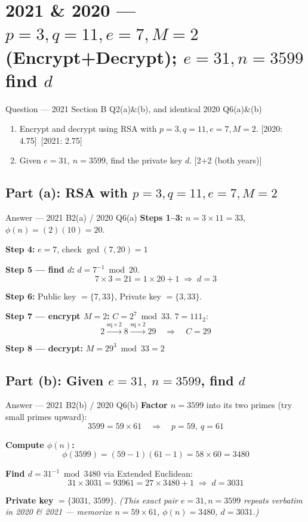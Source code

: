 \documentclass[12pt,a4paper]{article}
\begin{document}
\section{2021 \& 2020 --- $p=3,q=11,e=7,M=2$ (Encrypt+Decrypt); $e=31,n=3599$ find $d$}

\begin{qbox}{Question --- 2021 Section B Q2(a)\&(b), and identical 2020 Q6(a)\&(b)}
\begin{enumerate}[label=(\alph*)]
  \item Encrypt and decrypt using RSA with $p=3,q=11,e=7,M=2$. \hfill [2020: 4.75]\ [2021: 2.75]
  \item Given $e=31,\ n=3599$, find the private key $d$. \hfill [2+2 (both years)]
\end{enumerate}
\end{qbox}

\subsection{Part (a): RSA with $p=3,q=11,e=7,M=2$}
\begin{solbox}{Answer --- 2021 B2(a) / 2020 Q6(a)}
\textbf{Steps 1--3:} $n=3\times11=\boxed{33}$, \quad $\phi(n)=(2)(10)=\boxed{20}$.

\textbf{Step 4:} $e=7$, check $\gcd(7,20)=1$ \checkmark

\textbf{Step 5 --- find $d$:} $d=7^{-1}\bmod20$.
\[
7\times3=21=1\times20+1 \;\Rightarrow\; d=\boxed{3}
\]

\textbf{Step 6:} Public key $=\{7,33\}$, Private key $=\{3,33\}$.

\textbf{Step 7 --- encrypt $M=2$:} $C=2^7\bmod33$. $7=111_2$:
\[
2 \xrightarrow{\text{sq}\times2} 8 \xrightarrow{\text{sq}\times2} 29 \quad\Rightarrow\quad C=\boxed{29}
\]

\textbf{Step 8 --- decrypt:} $M=29^3\bmod33=\boxed{2}$ \checkmark
\end{solbox}

\subsection{Part (b): Given $e=31,\ n=3599$, find $d$}
\begin{solbox}{Answer --- 2021 B2(b) / 2020 Q6(b)}
\textbf{Factor $n=3599$} into its two primes (try small primes upward):
\[
3599 = 59 \times 61 \quad\Rightarrow\quad p=59,\ q=61
\]

\textbf{Compute $\phi(n)$:}
\[
\phi(3599)=(59-1)(61-1)=58\times60=\boxed{3480}
\]

\textbf{Find $d=31^{-1}\bmod3480$} via Extended Euclidean:
\[
31\times3031 = 93961 = 27\times3480+1 \;\Rightarrow\; d=\boxed{3031}
\]

\textbf{Private key} $=\{3031,\,3599\}$. \quad\textit{(This exact pair $e=31,n=3599$ repeats verbatim in 2020 \& 2021 --- memorize $n=59\times61$, $\phi(n)=3480$, $d=3031$.)}
\end{solbox}
\end{document}
